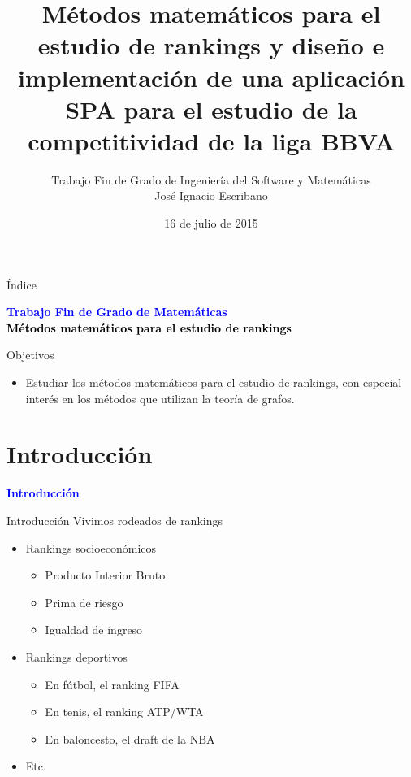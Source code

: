 \documentclass[10pt,hyperref={unicode}]{beamer}
\author[José Ignacio Escribano]{Trabajo Fin de Grado de Ingeniería del Software y Matemáticas \\ \vspace*{1em} José Ignacio Escribano}
\title[Trabajo Fin de Grado]{Métodos matemáticos para el estudio de rankings y diseño e implementación de una aplicación SPA para el estudio de la competitividad de la liga BBVA}
\date{16 de julio de 2015}
\institute[URJC]{\texttt{[image: imagenes/logoURJC.jpg]}}
\begin{document}
	
	\begin{frame}
		\maketitle
	\end{frame}

	\begin{frame}[allowframebreaks]{Índice}
		\tableofcontents
	\end{frame}
	
	\begin{frame}
		\begin{center}
			\Huge\textbf{\textsf{\textcolor{blue}{Trabajo Fin de Grado de Matemáticas}}} \\ 
			\vspace*{1em}
			\huge\textbf{\textsf{\textcolor{black}{ Métodos matemáticos para el estudio de rankings }}}
		\end{center}
	\end{frame}
		
	\begin{frame}{Objetivos}
		\begin{itemize}
			\item Estudiar los métodos matemáticos para el estudio de rankings, con especial interés en los métodos que utilizan la teoría de grafos.
		\end{itemize}
	\end{frame}
	
	\section{Introducción}
	
	\begin{frame}
		\begin{center}
			\Huge\textbf{\textsf{\textcolor{blue}{Introducción}}}
		\end{center}
	\end{frame}
	
	\begin{frame}{Introducción}
		Vivimos rodeados de rankings
		
		\begin{itemize}
			\item Rankings socioeconómicos
			\begin{itemize}
				\item Producto Interior Bruto
				\item Prima de riesgo
				\item Igualdad de ingreso
			\end{itemize}
			\item Rankings deportivos
			\begin{itemize}
				\item En fútbol, el ranking FIFA
				\item En tenis, el ranking ATP/WTA
				\item En baloncesto, el draft de la NBA
			\end{itemize}
			\item Etc.
		\end{itemize}
	\end{frame}
	
\end{document}
